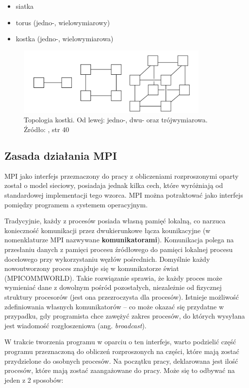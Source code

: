 \begin{itemize}
	\item siatka
	\item torus (jedno-, wielowymiarowy)
	\item kostka (jedno-, wielowymiarowa)
\end{itemize}

\begin{figure}[h]
	\centering
	\includegraphics[width=0.85\textwidth]{./img/kostki.png}
	\caption{Topologia kostki. Od lewej: jedno-, dwu- oraz trójwymiarowa. Źródło: \cite{Pacheco}, str 40}
	\label{img:sieć}
\end{figure}

\subsection{Zasada działania MPI}

MPI jako interfejs przeznaczony do pracy z obliczeniami rozproszonymi oparty został o model sieciowy, posiadaja jednak kilka cech, które wyróżniają od standardowej implementacji tego wzorca. MPI można potraktować jako interfejs pomiędzy programem a systemem operacyjnym.

Tradycyjnie, każdy z procesów posiada własną pamięć lokalną, co narzuca konieczność komunikacji przez dwukierunkowe łącza kounikacyjne (w nomenklaturze MPI nazwywane \textbf{komunikatorami}). Komunikacja polega na przesłaniu danych z pamięci procesu źródłowego do pamięci lokalnej procesu docelowego przy wykorzystaniu węzłów pośrednich. Domyślnie każdy nowoutworzony proces znajduje się w komunikatorze świat (MPI\textunderscore COMM\textunderscore WORLD). Takie rozwiązanie sprawia, że każdy proces może wymieniać dane z dowolnym pośród pozostałych, niezależnie od fizycznej struktury procesorów (jest ona przezroczysta dla procesów). Istnieje możliwość zdefiniowania własnych komunikatorów -- co może okazać się przydatne w przypadku, gdy programista chce zawężyć zakres procesów, do których wysyłana jest wiadomość rozgłoszeniowa (ang. \textit{broadcast}).

W trakcie tworzenia programu w oparciu o ten interfejs, warto podzielić część programu przeznaczoną do obliczeń rozproszonych na części, które mają zostać przydzielone do osobnych procesów. Na początku pracy, deklarowana jest ilość procesów, które mają zostać zaangażowane do pracy. Może się to odbywać na jeden z 2 sposobów:

